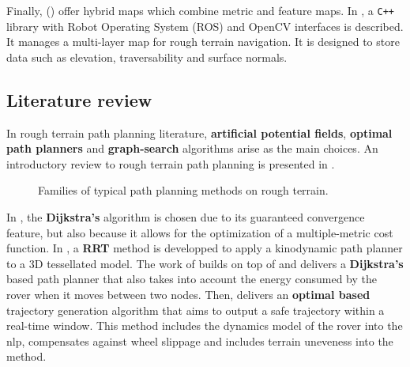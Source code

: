 Finally,  () offer hybrid maps which combine metric and feature maps. In \cite{Fankhauser2016GridMapLibrary}, a \verb!C++! library with Robot Operating System (ROS) and OpenCV interfaces is described. It manages a multi-layer map for rough terrain navigation. It is designed to store data such as elevation, traversability and surface normals.

\subsection{Literature review}
\label{subsection:pathPlanning} 

In rough terrain path planning literature, \textbf{artificial potential fields}, \textbf{optimal path planners} and \textbf{graph-search} algorithms arise as the main choices. An introductory review to rough terrain path planning is presented in \cite{Spero2002Path}.

\begin{figure}[h]
\centering
{}
\caption{Families of typical path planning methods on rough terrain.}
\label{fig:pathPlanningMethods}
\end{figure}

In \cite{Ishigami2007PathPlanning}, the \textbf{Dijkstra's} algorithm is chosen due to its guaranteed convergence feature, but also because it allows for the optimization of a multiple-metric cost function. In \cite{Spero2002Path}, a \textbf{RRT} method is developped to apply a kinodynamic path planner to a 3D tessellated model. The work of \citet{sakayori2021energy} builds on top of \cite{Ishigami2007PathPlanning} and delivers a \textbf{Dijkstra's} based path planner that also takes into account the energy consumed by the rover when it moves between two nodes. Then, \cite{howard2007optimal} delivers an \textbf{optimal based} trajectory generation algorithm that aims to output a safe trajectory within a real-time window. This method includes the dynamics model of the rover into the \acrshort{nlp}, compensates against wheel slippage and includes terrain uneveness into the method. 

